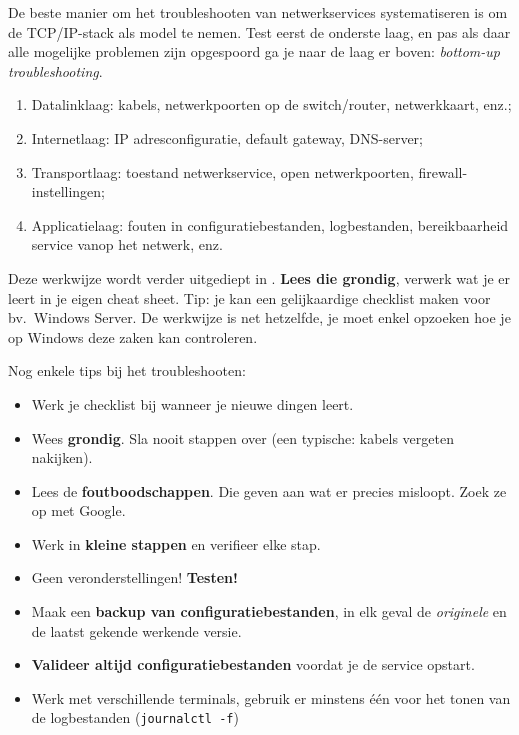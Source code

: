 De beste manier om het troubleshooten van netwerkservices systematiseren is om de TCP/IP-stack als model te nemen. Test eerst de onderste laag, en pas als daar alle mogelijke problemen zijn opgespoord ga je naar de laag er boven: \emph{bottom-up troubleshooting}.

\begin{enumerate}
  \item Datalinklaag: kabels, netwerkpoorten op de switch/router, netwerkkaart, enz.;
  \item Internetlaag: IP adresconfiguratie, default gateway, DNS-server;
  \item Transportlaag: toestand netwerkservice, open netwerkpoorten, firewall-instellingen;
  \item Applicatielaag: fouten in configuratiebestanden, logbestanden, bereikbaarheid service vanop het netwerk, enz.
\end{enumerate}

Deze werkwijze wordt verder uitgediept in \textcite{VanVreckem2015}. \textbf{Lees die grondig}, verwerk wat je er leert in je eigen cheat sheet. Tip: je kan een gelijkaardige checklist maken voor bv.~Windows Server. De werkwijze is net hetzelfde, je moet enkel opzoeken hoe je op Windows deze zaken kan controleren.

Nog enkele tips bij het troubleshooten:
\begin{itemize}
  \item Werk je checklist bij wanneer je nieuwe dingen leert.
  \item Wees \textbf{grondig}. Sla nooit stappen over (een typische: kabels vergeten nakijken).
  \item Lees de \textbf{foutboodschappen}. Die geven aan wat er precies misloopt. Zoek ze op met Google.
  \item Werk in \textbf{kleine stappen} en verifieer elke stap.
  \item Geen veronderstellingen! \textbf{Testen!}
  \item Maak een \textbf{backup van configuratiebestanden}, in elk geval de \emph{originele} en de laatst gekende werkende versie.
  \item \textbf{Valideer altijd configuratiebestanden} voordat je de service opstart.
  \item Werk met verschillende terminals, gebruik er minstens één voor het tonen van de logbestanden (\texttt{journalctl -f})
\end{itemize}
